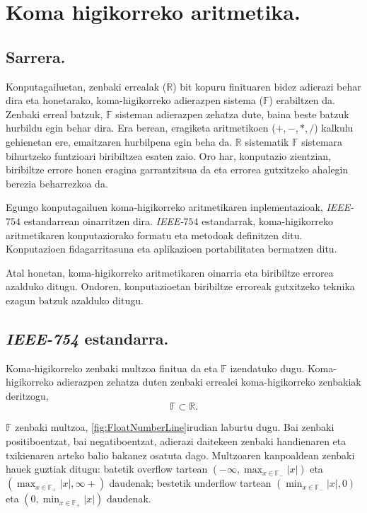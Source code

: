 \chapter{Koma higikorreko aritmetika.}
\label{sec:4}

\section{Sarrera.}

Konputagailuetan, zenbaki errealak ($\mathbb{R}$) bit kopuru finituaren bidez adierazi behar dira eta honetarako, koma-higikorreko adierazpen sistema ($\mathbb{F}$) erabiltzen da. Zenbaki erreal batzuk, $\mathbb{F}$ sisteman adierazpen zehatza dute, baina beste batzuk hurbildu egin behar dira.  Era berean, eragiketa aritmetikoen ($+,-,*,/$) kalkulu gehienetan ere, emaitzaren hurbilpena egin beha da. $\mathbb{R}$ sistematik $\mathbb{F}$ sistemara bihurtzeko funtzioari biribiltzea esaten zaio. Oro har, konputazio zientzian, biribiltze errore honen eragina garrantzitsua da eta errorea gutxitzeko ahalegin berezia beharrezkoa da.

Egungo konputagailuen koma-higikorreko aritmetikaren inplementazioak, \emph{IEEE-$754$} estandarrean oinarritzen dira. 
\emph{IEEE-$754$} estandarrak, koma-higikorreko aritmetikaren konputaziorako formatu eta metodoak definitzen ditu. Konputazioen fidagarritasuna eta aplikazioen portabilitatea bermatzen ditu.    
 
Atal honetan, koma-higikorreko aritmetikaren oinarria eta biribiltze errorea azalduko ditugu. Ondoren, konputazioetan biribiltze erroreak gutxitzeko teknika ezagun batzuk azalduko ditugu. 

\section{\emph{IEEE-754} estandarra.}

Koma-higikorreko zenbaki multzoa finitua da eta ${\mathbb{F}}$ izendatuko dugu. Koma-higikorreko adierazpen zehatza duten zenbaki errealei koma-higikorreko zenbakiak deritzogu, 
\begin{equation*}
\mathbb{F}\subset \mathbb{R}.
\end{equation*}

$\mathbb{F}$ zenbaki multzoa, \ref{fig:FloatNumberLine}irudian laburtu dugu. Bai zenbaki positiboentzat, bai negatiboentzat, adierazi daitekeen zenbaki handienaren eta txikienaren arteko balio bakanez osatuta dago. Multzoaren kanpoaldean zenbaki hauek guztiak ditugu: batetik overflow tartean $(-\infty,\max_{x \in \mathbb{F_{-}}}|x|)$  eta $(\max_{x \in \mathbb{F_{+}}}|x|,\infty+)$ daudenak; bestetik underflow tartean  $(\min_{x \in \mathbb{F_{-}}}|x|,0)$ eta $(0,\min_{x \in \mathbb{F_{+}}}|x|)$ daudenak. 

